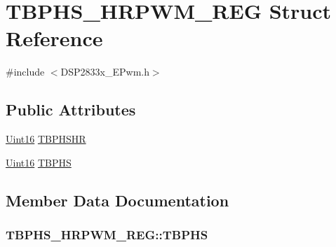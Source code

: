 \hypertarget{struct_t_b_p_h_s___h_r_p_w_m___r_e_g}{}\section{T\+B\+P\+H\+S\+\_\+\+H\+R\+P\+W\+M\+\_\+\+R\+E\+G Struct Reference}
\label{struct_t_b_p_h_s___h_r_p_w_m___r_e_g}


{\ttfamily \#include $<$D\+S\+P2833x\+\_\+\+E\+Pwm.\+h$>$}

\subsection*{Public Attributes}
\begin{DoxyCompactItemize}
\item 
\hyperlink{_d_s_p2833x___device_8h_a59a9f6be4562c327cbfb4f7e8e18f08b}{Uint16} \hyperlink{struct_t_b_p_h_s___h_r_p_w_m___r_e_g_af476ff5e3f9fbffaad0fecfab7f28488}{T\+B\+P\+H\+S\+H\+R}
\item 
\hyperlink{_d_s_p2833x___device_8h_a59a9f6be4562c327cbfb4f7e8e18f08b}{Uint16} \hyperlink{struct_t_b_p_h_s___h_r_p_w_m___r_e_g_a28482d2987c5726d3001fb5a863de78a}{T\+B\+P\+H\+S}
\end{DoxyCompactItemize}


\subsection{Member Data Documentation}
\hypertarget{struct_t_b_p_h_s___h_r_p_w_m___r_e_g_a28482d2987c5726d3001fb5a863de78a}{}
\subsubsection[{T\+B\+P\+H\+S}]{ T\+B\+P\+H\+S\+\_\+\+H\+R\+P\+W\+M\+\_\+\+R\+E\+G\+::\+T\+B\+P\+H\+S}\label{struct_t_b_p_h_s___h_r_p_w_m___r_e_g_a28482d2987c5726d3001fb5a863de78a}
\hypertarget{struct_t_b_p_h_s___h_r_p_w_m___r_e_g_af476ff5e3f9fbffaad0fecfab7f28488}{}
